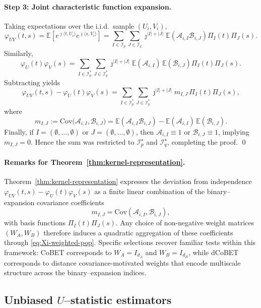 \documentclass[12pt,reqno,oneside]{amsbook}
\theoremstyle{definition}
\theoremstyle{remark}
\begin{document}
\paragraph{Step 3: Joint characteristic function expansion.}
Taking expectations over the i.i.d.\ sample $(U_i,V_i)$,
\[
\varphi_{UV}(t,s)
=
\mathbb E\!\left[
e^{\jmath\langle t,U_i\rangle}
e^{\jmath\langle s,V_i\rangle}
\right]
=
\sum_{I\in\mathcal I_p}
\sum_{J\in\mathcal I_q}
\jmath^{|I|+|J|}
\mathbb E(\mathcal A_{i,I}\mathcal B_{i,J})
\Pi_I(t)\Pi_J(s).
\]
Similarly,
\[
\varphi_U(t)\varphi_V(s)
=
\sum_{I\in\mathcal I_p^*}
\sum_{J\in\mathcal I_q^*}
\jmath^{|I|+|J|}
\mathbb E(\mathcal A_{i,I})\,
\mathbb E(\mathcal B_{i,J})
\Pi_I(t)\Pi_J(s).
\]
Subtracting yields
\[
\varphi_{UV}(t,s)-\varphi_U(t)\varphi_V(s)
=
\sum_{I\in\mathcal I_p^*}
\sum_{J\in\mathcal I_q^*}
\jmath^{|I|+|J|}
m_{I,J}\,
\Pi_I(t)\Pi_J(s),
\]
where
\[
m_{I,J}
:=
\mbox{Cov}\!\bigl(\mathcal A_{i,I},\mathcal B_{i,J}\bigr)
=
\mathbb E(\mathcal A_{i,I}\mathcal B_{i,J})
-
\mathbb E(\mathcal A_{i,I})\,
\mathbb E(\mathcal B_{i,J}).
\]
Finally, if $I=(\emptyset,\dots,\emptyset)$ or
$J=(\emptyset,\dots,\emptyset)$, then
$\mathcal A_{i,I}\equiv 1$ or $\mathcal B_{i,J}\equiv 1$, implying
$m_{I,J}=0$. Hence the sum was restricted to
$\mathcal I_p^\star$ and $\mathcal I_q^\star$, completing the proof.
\qed

\paragraph{Remarks for Theorem~\ref{thm:kernel-representation}.}
Theorem~\ref{thm:kernel-representation} expresses the deviation from independence
$\varphi_{UV}(t,s)-\varphi_U(t)\varphi_V(s)$ as a finite linear combination of
the binary--expansion covariance coefficients
\[
m_{I,J}=\mbox{Cov}(\mathcal A_{i,I},\mathcal B_{i,J}),
\]
with basis functions $\Pi_I(t)\Pi_J(s)$.
Any choice of non-negative weight matrices $(W_A,W_B)$ therefore induces a quadratic aggregation
of these coefficients through \eqref{eq:Xi-weighted-pop}.
Specific selections recover familiar tests within this framework:
CoBET corresponds to $W_A=I_{d_A}$ and $W_B=I_{d_B}$, while dCoBET corresponds to distance covariance-motivated weights that encode multiscale structure
across the binary--expansion indices.
\subsection{Unbiased $U$--statistic estimators}
\label{sec:Ustat-weighted}
\end{document}
